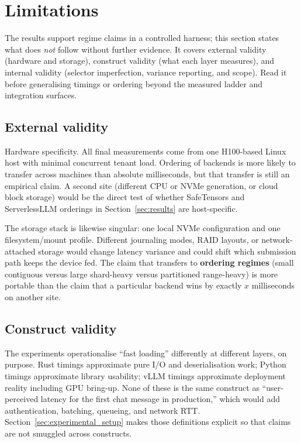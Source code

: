\section{Limitations}
\label{sec:limitations}

The results support regime claims in a controlled harness; this section states what does \emph{not} follow without further evidence. It covers external validity (hardware and storage), construct validity (what each layer measures), and internal validity (selector imperfection, variance reporting, and scope). Read it before generalising timings or ordering beyond the measured ladder and integration surfaces.

\subsection{External validity}

Hardware specificity. All final measurements come from one H100-based Linux host with minimal concurrent tenant load. Ordering of backends is more likely to transfer across machines than absolute milliseconds, but that transfer is still an empirical claim. A second site (different CPU or NVMe generation, or cloud block storage) would be the direct test of whether SafeTensors and ServerlessLLM orderings in Section~\ref{sec:results} are host-specific.

The storage stack is likewise singular: one local NVMe configuration and one filesystem/mount profile. Different journaling modes, RAID layouts, or network-attached storage would change latency variance and could shift which submission path keeps the device fed. The claim that transfers to \textbf{ordering regimes} (small contiguous versus large shard-heavy versus partitioned range-heavy) is more portable than the claim that a particular backend wins by exactly $x$ milliseconds on another site.

\subsection{Construct validity}

The experiments operationalise ``fast loading'' differently at different layers, on purpose. Rust timings approximate pure I/O and deserialisation work; Python timings approximate library usability; vLLM timings approximate deployment reality including GPU bring-up. None of these is the same construct as ``user-perceived latency for the first chat message in production,'' which would add authentication, batching, queueing, and network RTT. Section~\ref{sec:experimental_setup} makes those definitions explicit so that claims are not smuggled across constructs.

